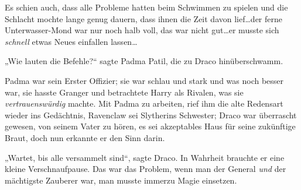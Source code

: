 Es schien auch, dass alle Probleme hatten beim Schwimmen zu spielen und die Schlacht mochte lange genug dauern, dass ihnen die Zeit davon lief…der ferne Unterwasser-Mond war nur noch halb voll, das war nicht gut…er musste sich \emph{schnell} etwas Neues einfallen lassen…

„Wie lauten die Befehle?“ sagte Padma Patil, die zu Draco hinüberschwamm.

Padma war sein Erster Offizier; sie war schlau und stark und was noch besser war, sie hasste Granger und betrachtete Harry als Rivalen, was sie \emph{vertrauenswürdig} machte. Mit Padma zu arbeiten, rief ihm die alte Redensart wieder ins Gedächtnis, Ravenclaw sei Slytherins Schwester; Draco war überrascht gewesen, von seinem Vater zu hören, es sei akzeptables Haus für seine zukünftige Braut, doch nun erkannte er den Sinn darin.

„Wartet, bis alle versammelt sind“, sagte Draco. In Wahrheit brauchte er eine kleine Verschnaufpause. Das war das Problem, wenn man der General \emph{und} der mächtigste Zauberer war, man musste immerzu Magie einsetzen.

